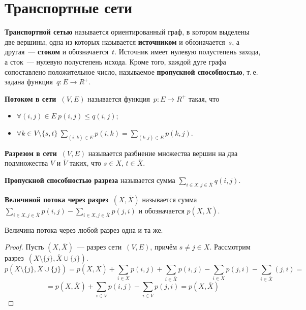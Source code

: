 \section{Транспортные сети}
   \textbf{Транспортной сетью} называется ориентированный граф, в котором выделены две вершины, одна из которых называется \textbf{источником} и обозначается~$s$, а другая~--- \textbf{стоком} и обозначается~$t$.
Источник имеет нулевую полустепень захода, а сток~--- нулевую полустепень исхода.
 Кроме того, каждой дуге графа сопоставлено положительное число, называемое \textbf{пропускной способностью}, т.\,е. задана функция~$q \colon E \to R^+$.

 \textbf{Потоком в сети~$(V, E)$} называется функция~$p \colon E \to R^+$ такая, что
\begin{itemize}
	\item $\forall (i, j) \in E \ p(i, j) \leqslant q(i, j)$;
	\item $\forall k \in V \setminus \{ s, t \} \ \sum\limits_{(i, k) \in E} p(i, k) = \sum\limits_{(k, j) \in E} p(k, j)$.
\end{itemize}

 \textbf{Разрезом в сети~$(V, E)$} называется разбиение множества вершин на два подмножества $V$ и $\overline V$ таких, что $s \in X$, $t \in \overline X$.

\textbf{Пропускной способностью разреза} называется сумма $\sum\limits_{i \in X, j \in \overline X} q(i, j)$.

\textbf{Величиной потока через разрез~$(X, \overline X)$} называется сумма $\sum\limits_{i \in X, j \in \overline X} p(i, j) -
\sum\limits_{i \in X, j \in \overline X} p(j, i)$ и обозначается $p(X, \overline X)$.

\begin{lemma}
Величина потока через любой разрез одна и та же.
\end{lemma}
\begin{proof}
Пусть $(X, \overline X)$~--- разрез сети~$(V, E)$, причём $s \neq j \in X$.
Рассмотрим разрез~$(X \setminus \{ j \}, \overline X \cup \{ j \})$.
\begin{equation*}
p(X \setminus \{ j \}, \overline X \cup \{ j \}) = p(X, \overline X) +
\sum_{i \in X} p(i, j) + \sum_{i \in \overline X} p(i, j) -
\sum_{i \in X} p(j, i) - \sum_{i \in \overline X} (j, i) =
\end{equation*}
\begin{equation*}
= p(X, \overline X) + \sum_{i \in V} p(i, j) - \sum_{i \in V} p(j, i) =
p(X, \overline X)
\end{equation*}
\end{proof}

